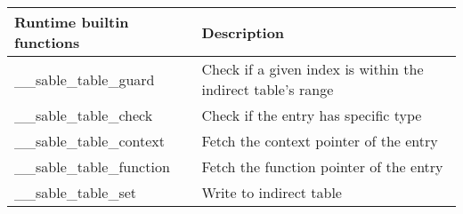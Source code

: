 \begin{tabular}{|l|l|}
    \hline
    \textbf{Runtime builtin functions} & \textbf{Description}                                        \\ \hline
    \_\_sable\_table\_guard            & Check if a given index is within the indirect table's range \\ \hline
    \_\_sable\_table\_check            & Check if the entry has specific type                        \\ \hline
    \_\_sable\_table\_context          & Fetch the context pointer of the entry                      \\ \hline
    \_\_sable\_table\_function         & Fetch the function pointer of the entry                     \\ \hline
    \_\_sable\_table\_set              & Write to indirect table                                     \\ \hline
\end{tabular}